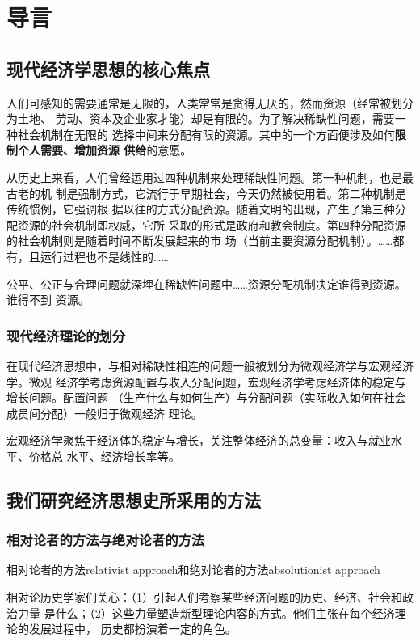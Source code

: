 \chapter{导言}

\section{现代经济学思想的核心焦点}

人们可感知的需要通常是无限的，人类常常是贪得无厌的，然而资源（经常被划分为土地、
劳动、资本及企业家才能）却是有限的。为了解决稀缺性问题，需要一种社会机制在无限的
选择中间来分配有限的资源。其中的一个方面便涉及如何\textbf{限制个人需要、增加资源
  供给}的意愿。

从历史上来看，人们曾经运用过四种机制来处理稀缺性问题。第一种机制，也是最古老的机
制是强制方式，它流行于早期社会，今天仍然被使用着。第二种机制是传统惯例，它强调根
据以往的方式分配资源。随着文明的出现，产生了第三种分配资源的社会机制即权威，它所
采取的形式是政府和教会制度。第四种分配资源的社会机制则是随着时间不断发展起来的市
场（当前主要资源分配机制）。……都有，且运行过程也不是线性的……

公平、公正与合理问题就深埋在稀缺性问题中……资源分配机制决定谁得到资源。谁得不到
资源。

\subsection{现代经济理论的划分}

在现代经济思想中，与相对稀缺性相连的问题一般被划分为微观经济学与宏观经济学。微观
经济学考虑资源配置与收入分配问题，宏观经济学考虑经济体的稳定与增长问题。配置问题
（生产什么与如何生产）与分配问题（实际收入如何在社会成员间分配）一般归于微观经济
理论。

宏观经济学聚焦于经济体的稳定与增长，关注整体经济的总变量：收入与就业水平、价格总
水平、经济增长率等。

\section{我们研究经济思想史所采用的方法}

\subsection{相对论者的方法与绝对论者的方法}

相对论者的方法relativist approach和绝对论者的方法absolutionist approach

相对论历史学家们关心：（1）引起人们考察某些经济问题的历史、经济、社会和政治力量
是什么；（2）这些力量塑造新型理论内容的方式。他们主张在每个经济理论的发展过程中，
历史都扮演着一定的角色。

